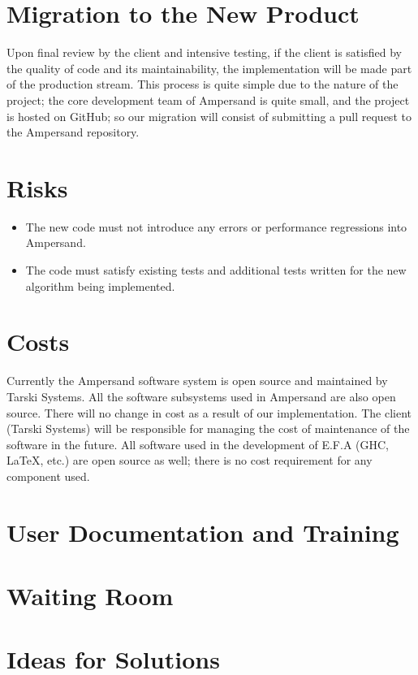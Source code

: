 \documentclass[12pt]{report}
\begin{document}
\section{Migration to the New Product}\label{sec:Migration}
Upon final review by the client and intensive testing, if the client is
satisfied by the quality of code and its maintainability, the implementation
will be made part of the production stream.  This process is quite simple due to
the nature of the project; the core development team of Ampersand is quite
small, and the project is hosted on GitHub; so our migration will consist of
submitting a pull request to the Ampersand repository.
\section{Risks}\label{sec:Risks}
\begin{itemize}
\item The new code must not introduce any 
errors or performance regressions
into Ampersand.
\item The code must satisfy existing tests and 
additional tests written for the new algorithm being implemented.
\end{itemize}

\section{Costs}\label{sec:Costs}
Currently the Ampersand software system is open source and maintained by Tarski
Systems.  All the software subsystems used in Ampersand are also open
source. There will no change in cost as a result of our implementation. The
client (Tarski Systems) will be responsible for managing the cost of
maintenance of the software in the future. All software used in the development
of E.F.A (GHC, LaTeX, etc.) are open source as well; there is no cost
requirement for any component used.
\section{User Documentation and Training}\label{sec:UserDoc}
\section{Waiting Room}\label{sec:Waiting}
\section{Ideas for Solutions}\label{sec:Solutions}




\end{document}
